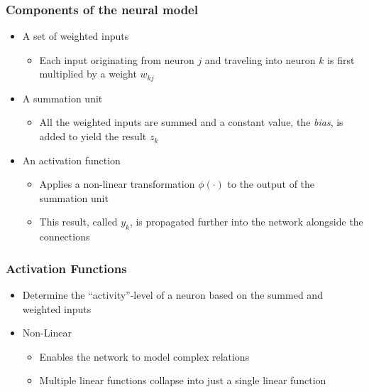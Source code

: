 \begin{frame}
  \frametitle{Components of the neural model}
  \begin{itemize}
   \item A set of weighted inputs
     \begin{itemize}
       \item Each input originating from neuron \(j\) and traveling
         into neuron \(k\) is first multiplied by a weight \(w_{kj}\)
     \end{itemize}
   \item A summation unit
     \begin{itemize}
       \item All the weighted inputs are summed and a constant value,
         the \textit{bias}, is added to yield the result \(z_k\)
     \end{itemize}
   \item An activation function
     \begin{itemize}
       \item Applies a non-linear transformation \(\phi(\cdot)\) to
         the output of the summation unit
       \item This result, called \(y_k\), is propagated further into
         the network alongside the connections
     \end{itemize}
  \end{itemize}
\end{frame}

\begin{frame}
  \frametitle{Activation Functions}
  \begin{itemize}
    \item Determine the ``activity''-level of a neuron based on the
      summed and weighted inputs
    \item Non-Linear
      \begin{itemize}
        \item Enables the network to model complex relations
        \item Multiple linear functions collapse into just a single
          linear function
      \end{itemize}
  \end{itemize}
\end{frame}

